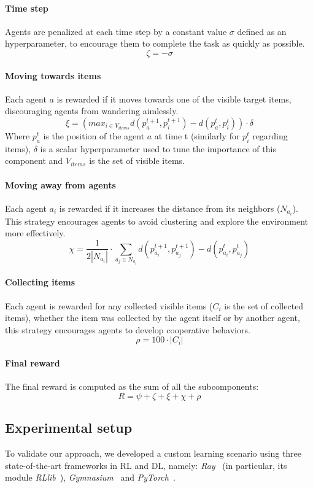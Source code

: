 \documentclass[sigconf]{acmart}
\begin{document}
\paragraph{Time step} Agents are penalized at each time step by a constant value $\sigma$ defined as
    an hyperparameter, to encourage them to complete the task as quickly as possible.
    \[ \zeta = - \sigma \]
 
\paragraph{Moving towards items} Each agent $a$ is rewarded if it moves towards one of the visible target items, discouraging agents from wandering aimlessly.
    \[ \xi = (max_{i \in V_{items}} d(p_a^{t+1}, p_i^{t+1}) - d(p_a^{t}, p_i^{t})) \cdot \delta\]
    Where $p_a^t$ is the position of the agent $a$ at time t (similarly for $p_i^{t}$ regarding items),
    $\delta$ is a scalar hyperparameter used to tune the importance of this component and
    $V_{items}$ is the set of visible items.
\paragraph{Moving away from agents} Each agent $a_i$ is rewarded if it increases the distance from its neighbors ($N_{a_i}$). This strategy encourages agents to avoid clustering and explore the environment more effectively.
    \[ \chi = \frac{1}{2|N_{a_i}|} \cdot \sum_{a_j \in N_{a_i}} d(p_{a_i}^{t+1}, p_{a_j}^{t+1}) - d(p_{a_i}^{t}, p_{a_j}^{t}) \]

\paragraph{Collecting items} Each agent is rewarded for any collected visible items ($C_i$ is the set of collected items), 
    whether the item was collected by  the agent itself or by another agent, this strategy encourages agents 
    to develop cooperative behaviors.
    \[ \rho = 100 \cdot |C_i| \]

\paragraph{Final reward} The final reward is computed as the sum of all the subcomponents:
  \[ R = \psi + \zeta + \xi + \chi + \rho \]
  
\subsection{Experimental setup}
To validate our approach, we developed a custom learning scenario using three state-of-the-art frameworks 
  in RL and DL, namely: \emph{Ray}~\cite{DBLP:conf/osdi/MoritzNWTLLEYPJ18} 
  (in particular, its module \emph{RLlib}~\cite{DBLP:conf/icml/LiangLNMFGGJS18}),
  \emph{Gymnasium}~\cite{DBLP:journals/corr/abs-2407-17032}
  and \emph{PyTorch}~\cite{DBLP:conf/nips/PaszkeGMLBCKLGA19}.
\end{document}
